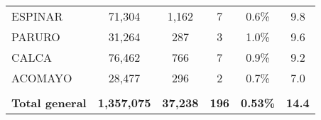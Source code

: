 \begin{tabular}{lccccc}
	\cellcolor[HTML]{FFFF99}ESPINAR                                 & 71,304               & 1,162                                & 7                    & 0.6\%                      & 9.8                                         \\
	\cellcolor[HTML]{FFFF99}PARURO                                  & 31,264               & 287                                  & 3                    & 1.0\%                      & 9.6                                         \\
	\cellcolor[HTML]{FFFF99}CALCA                                   & 76,462               & 766                                  & 7                    & 0.9\%                      & 9.2                                         \\
	\cellcolor[HTML]{FFFF99}ACOMAYO                                 & 28,477               & 296                                  & 2                    & 0.7\%                      & 7.0                                         \\
	& \multicolumn{1}{l}{} & \multicolumn{1}{l}{}                 & \multicolumn{1}{l}{} & \multicolumn{1}{l}{}       & \multicolumn{1}{l}{}                        \\
	\rowcolor[HTML]{DDEBF7} 
	\textbf{Total general}                                          & \textbf{1,357,075}   & \textbf{37,238}                      & \textbf{196}         & \textbf{0.53\%}            & \textbf{14.4}                              
\end{tabular}
